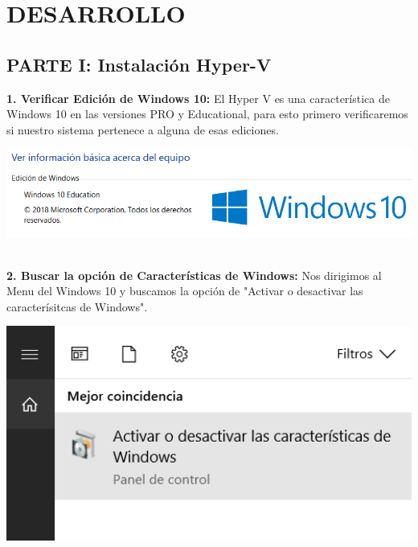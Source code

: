 \section{DESARROLLO}
\begin{enumerate}

\vspace{12pt}
\subsection{PARTE I: Instalación Hyper-V}

\textbf {1. Verificar Edición de Windows 10:} El Hyper V es una característica de Windows 10 en las versiones PRO y Educational, para esto primero verificaremos si nuestro sistema pertenece a alguna de esas ediciones.
\begin{center}
  \includegraphics[width=15cm]{Imagenes/Windows_Education.png}
\end{center}
\vspace{15pt}\\

\textbf {2. Buscar la opción de Características de Windows:} Nos dirigimos al Menu del Windows 10 y buscamos la opción de "Activar o desactivar las caracterísitcas de Windows".\\
\begin{center}
  \includegraphics[width=15cm]{Imagenes/Activar_Caracteristicas.png}
\end{center}
\break


\end{enumerate}
